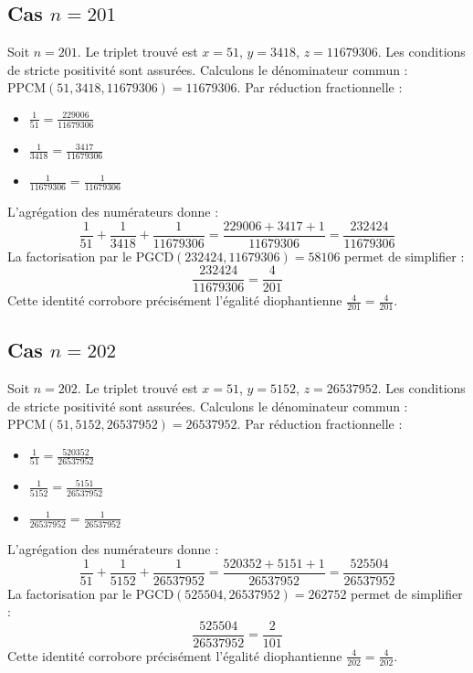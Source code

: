 \documentclass[11pt,a4paper]{article}
\begin{document}
\subsection{Cas $n = 201$}
Soit $n = 201$. Le triplet trouvé est $x = 51$, $y = 3418$, $z = 11679306$.
Les conditions de stricte positivité sont assurées.
Calculons le dénominateur commun : $\text{PPCM}(51, 3418, 11679306) = 11679306$.
Par réduction fractionnelle :
\begin{itemize}
    \item $\frac{1}{51} = \frac{229006}{11679306}$
    \item $\frac{1}{3418} = \frac{3417}{11679306}$
    \item $\frac{1}{11679306} = \frac{1}{11679306}$
\end{itemize}
L'agrégation des numérateurs donne :
$$ \frac{1}{51} + \frac{1}{3418} + \frac{1}{11679306} = \frac{229006 + 3417 + 1}{11679306} = \frac{232424}{11679306} $$
La factorisation par le $\text{PGCD}(232424, 11679306) = 58106$ permet de simplifier :
$$ \frac{232424}{11679306} = \frac{4}{201} $$
Cette identité corrobore précisément l'égalité diophantienne $\frac{4}{201} = \frac{4}{201}$.

\subsection{Cas $n = 202$}
Soit $n = 202$. Le triplet trouvé est $x = 51$, $y = 5152$, $z = 26537952$.
Les conditions de stricte positivité sont assurées.
Calculons le dénominateur commun : $\text{PPCM}(51, 5152, 26537952) = 26537952$.
Par réduction fractionnelle :
\begin{itemize}
    \item $\frac{1}{51} = \frac{520352}{26537952}$
    \item $\frac{1}{5152} = \frac{5151}{26537952}$
    \item $\frac{1}{26537952} = \frac{1}{26537952}$
\end{itemize}
L'agrégation des numérateurs donne :
$$ \frac{1}{51} + \frac{1}{5152} + \frac{1}{26537952} = \frac{520352 + 5151 + 1}{26537952} = \frac{525504}{26537952} $$
La factorisation par le $\text{PGCD}(525504, 26537952) = 262752$ permet de simplifier :
$$ \frac{525504}{26537952} = \frac{2}{101} $$
Cette identité corrobore précisément l'égalité diophantienne $\frac{4}{202} = \frac{4}{202}$.
\end{document}
